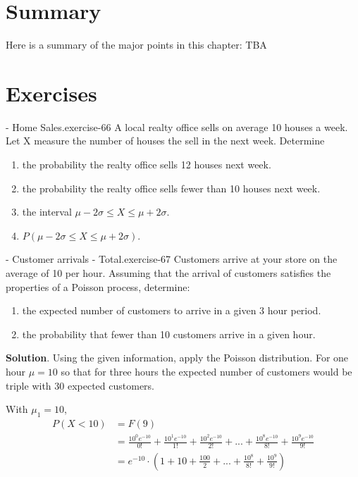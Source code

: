 \documentclass[10pt,]{book}
\numberwithin{equation}{section}
\newcommand{\lt}{<}
\begin{document}
\section[{Summary}]{Summary}\label{section-55}
\hypertarget{p-996}{}%
Here is a summary of the major points in this chapter:%
\hypertarget{p-997}{}%
TBA%
%
%
\typeout{************************************************}
\typeout{************************************************}
%
\section[{Exercises}]{Exercises}\label{section-56}
\hypertarget{p-998}{}%
\begin{inlineexercise}{- Home Sales.}{exercise-66}%
\hypertarget{p-999}{}%
A local realty office sells on average 10 houses a week.  Let X measure the number of houses the sell in the next week.  Determine \leavevmode%
\begin{enumerate}
\item\hypertarget{li-295}{}the probability the realty office sells 12 houses next week.%
\item\hypertarget{li-296}{}the probability the realty office sells fewer than 10 houses next week.%
\item\hypertarget{li-297}{}the interval \(\mu - 2\sigma \le X \le \mu + 2\sigma\).%
\item\hypertarget{li-298}{}\(P(\mu - 2\sigma \le X \le \mu + 2\sigma)\).%
\end{enumerate}
%
\end{inlineexercise}
%
\par
\hypertarget{p-1000}{}%
\begin{inlineexercise}{- Customer arrivals - Total.}{exercise-67}%
\hypertarget{p-1001}{}%
Customers arrive at your store on the average of 10 per hour.  Assuming that the arrival of customers satisfies the properties of a Poisson process, determine: \leavevmode%
\begin{enumerate}
\item\hypertarget{li-299}{}the expected number of customers to arrive in a given 3 hour period.%
\item\hypertarget{li-300}{}the probability that fewer than 10 customers arrive in a given hour.%
\end{enumerate}
 \textbf{Solution}.\quad%
\hypertarget{p-1002}{}%
Using the given information, apply the Poisson distribution.  For one hour \(\mu = 10\) so that for three hours the expected number of customers would be triple with 30 expected customers.%
\par
\hypertarget{p-1003}{}%
With \(\mu_1 = 10\),%
\begin{align*}
P(X \lt 10) & = F(9)\\
& = \frac{10^0 e^{-10}}{0!} + \frac{10^1 e^{-10}}{1!} + \frac{10^2 e^{-10}}{2!} + ... + \frac{10^8 e^{-10}}{8!} + \frac{10^9 e^{-10}}{9!}\\
& = e^{-10} \cdot ( 1 + 10 + \frac{100}{2} + ... + \frac{10^8}{8!} + \frac{10^9}{9!} )
\end{align*}
%
%
\end{inlineexercise}
\end{document}
